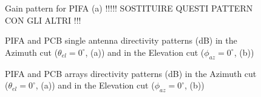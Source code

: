 \documentclass[10pt,a4paper,twocolumn]{article}
\begin{document}
{\begin{figure}[b!]
	\centering
			\begin{subfigure}{0.45\linewidth}
		\def\svgwidth{\linewidth}
	\tiny{}
		\caption{}
	\end{subfigure}
	\begin{subfigure}{0.45\linewidth}
	\def\svgwidth{\linewidth}
	\tiny{}
	\caption{}
\end{subfigure}
	\begin{subfigure}{0.45\linewidth}
	\def\svgwidth{\linewidth}
	\tiny{}
	\caption{}
\end{subfigure}
	\begin{subfigure}{0.45\linewidth}
	\def\svgwidth{\linewidth}
	\tiny{}
	\caption{}
\end{subfigure}

	\caption{Gain pattern for PIFA (a) !!!!! SOSTITUIRE QUESTI PATTERN CON GLI ALTRI !!!}
\end{figure}

\begin{figure}[b!]
		\begin{subfigure}{0.45\linewidth}
				\def\svgwidth{\linewidth}
			\tiny{}
			\caption{}
		\end{subfigure}
	\hfill
		\begin{subfigure}{0.45\linewidth}
				\def\svgwidth{\linewidth}
			\tiny{}
			\caption{}	\end{subfigure}	\hfill
		\caption{
			PIFA and PCB single antenna directivity patterns (dB) in the Azimuth cut  ($\theta_{el}=0^\circ$, (a)) and in the Elevation cut ($\phi_{az}=0^\circ$, (b))}

\end{figure}

\begin{figure}[b!]
	\begin{subfigure}{0.45\linewidth}
		\def\svgwidth{\linewidth}
		\tiny{}
		\caption{}
	\end{subfigure}
	\hfill
	\begin{subfigure}{0.45\linewidth}
		\def\svgwidth{\linewidth}
		\tiny{}
		\caption{}	\end{subfigure}
	\caption{PIFA and PCB arrays directivity patterns (dB) in the Azimuth cut  ($\theta_{el}=0^\circ$, (a)) and in the Elevation cut ($\phi_{az}=0^\circ$, (b))}
\end{figure}


}
\end{document}
